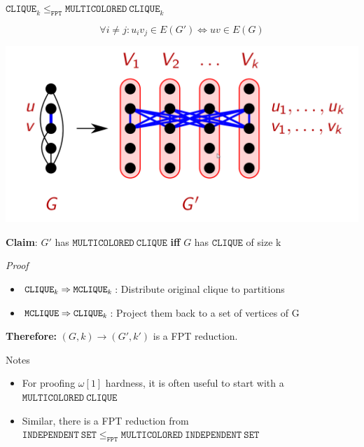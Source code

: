 \begin{frame}[c]{$\mathtt{CLIQUE}_k \leq_{\mathtt{FPT}} \mathtt{MULTICOLORED~CLIQUE}_k$}

$$\forall i \neq j: u_iv_j \in E(G') \Leftrightarrow uv \in E(G)$$

    \begin{center}
        \includegraphics[scale=0.17]{img/Unbenannt.png}
    \end{center}
    
\pause\textbf{Claim}: $G'$ has $\mathtt{MULTICOLORED~CLIQUE}$ \textbf{iff} $G$ has $\mathtt{CLIQUE}$ of size k

\textit{Proof} 
\begin{itemize}
    \item $\mathtt{CLIQUE}_k \Rightarrow \mathtt{M\-CLIQUE}_k$: Distribute original clique to partitions
    \item $\mathtt{M\-CLIQUE} \Rightarrow \mathtt{CLIQUE}_k$: Project them back to a set of vertices of G
\end{itemize}
\pause\textbf{Therefore: }$(G,k) \longrightarrow (G',k')$ is a FPT reduction. 
\end{frame}

\begin{frame}[c]{Notes}
\begin{itemize}
\item  For proofing $\omega[1]$ hardness, it is often useful to start with a $\mathtt{MULTICOLORED~CLIQUE}$
\item Similar, there is a FPT reduction from $\mathtt{INDEPENDENT~SET} \leq_{\mathtt{FPT}} \mathtt{MULTICOLORED~INDEPENDENT~SET}$
\end{itemize}
\end{frame}


